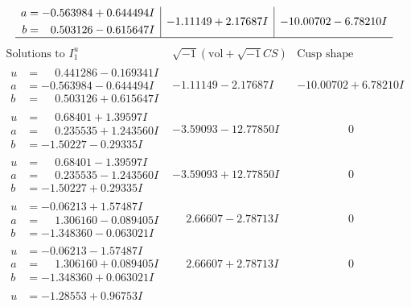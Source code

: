 \documentclass[1p]{elsarticle_modified}
\theoremstyle{definition}
\newcommand{\I}{\sqrt{-1}}
\begin{document}
$$\begin{array}{c|c|c}
\begin{aligned}
a &= -0.563984 + 0.644494 I \\
b &= \phantom{-}0.503126 - 0.615647 I\end{aligned}
 & -1.11149 + 2.17687 I & -10.00702 - 6.78210 I\\
 \hline 
 \end{array}$$\newpage$$\begin{array}{c|c|c}  
\text{Solutions to }I^u_{1}& \I (\text{vol} + \sqrt{-1}CS) & \text{Cusp shape}\\
 \hline 
\begin{aligned}
u &= \phantom{-}0.441286 - 0.169341 I \\
a &= -0.563984 - 0.644494 I \\
b &= \phantom{-}0.503126 + 0.615647 I\end{aligned}
 & -1.11149 - 2.17687 I & -10.00702 + 6.78210 I \\ \hline\begin{aligned}
u &= \phantom{-}0.68401 + 1.39597 I \\
a &= \phantom{-}0.235535 + 1.243560 I \\
b &= -1.50227 - 0.29335 I\end{aligned}
 & -3.59093 - 12.77850 I & \phantom{-0.000000 } 0 \\ \hline\begin{aligned}
u &= \phantom{-}0.68401 - 1.39597 I \\
a &= \phantom{-}0.235535 - 1.243560 I \\
b &= -1.50227 + 0.29335 I\end{aligned}
 & -3.59093 + 12.77850 I & \phantom{-0.000000 } 0 \\ \hline\begin{aligned}
u &= -0.06213 + 1.57487 I \\
a &= \phantom{-}1.306160 - 0.089405 I \\
b &= -1.348360 - 0.063021 I\end{aligned}
 & \phantom{-}2.66607 - 2.78713 I & \phantom{-0.000000 } 0 \\ \hline\begin{aligned}
u &= -0.06213 - 1.57487 I \\
a &= \phantom{-}1.306160 + 0.089405 I \\
b &= -1.348360 + 0.063021 I\end{aligned}
 & \phantom{-}2.66607 + 2.78713 I & \phantom{-0.000000 } 0 \\ \hline\begin{aligned}
u &= -1.28553 + 0.96753 I \\

\end{aligned}
\end{array}$$
\end{document}
